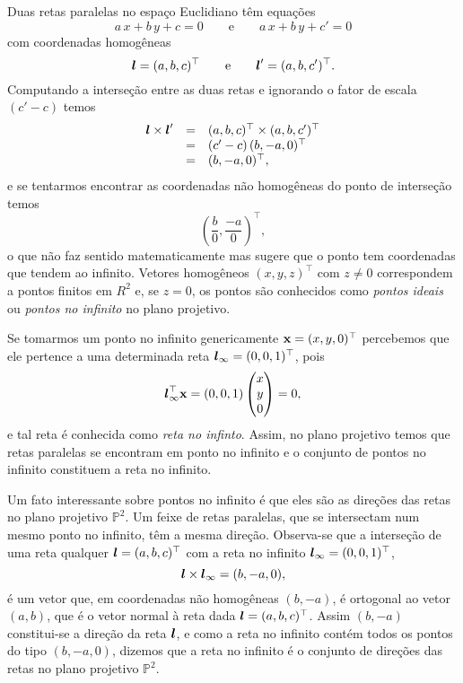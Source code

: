 Duas retas paralelas no espaço Euclidiano têm equações
\begin{equation*}
a\,x+b\,y+c=0\qquad\text{e}\qquad a\,x+b\,y+c'=0
\end{equation*}
com coordenadas homogêneas
\begin{equation*}
\boldsymbol{l}=(a,b,c)^\top\qquad\text{e}\qquad\boldsymbol{l}'=(a,b,c')^\top.
\end{equation*}
Computando a interseção entre as duas retas e ignorando o fator de escala $(c'-c)$ temos
\begin{equation*}
\begin{array}{rcl}
\boldsymbol{l}\times\boldsymbol{l}'&=&(a,b,c)^\top\times(a,b,c')^\top\\
&=&(c'-c)\,(b,-a,0)^\top\\
&=&(b,-a,0)^\top,
\end{array}
\end{equation*}
e se tentarmos encontrar as coordenadas não homogêneas do ponto de interseção temos
\begin{equation*}
\left(\frac{b}{0},\frac{-a}{0}\right)^\top,
\end{equation*}
o que não faz sentido matematicamente mas sugere que o ponto tem coordenadas que tendem ao infinito. Vetores homogêneos $(x,y,z)^\top$ com $z\neq0$ correspondem a pontos finitos em $R^2$ e, se $z=0$, os pontos são conhecidos como \textit{pontos ideais} ou \textit{pontos no infinito} no plano projetivo.

Se tomarmos um ponto no infinito genericamente $\mathbf{x}=(x,y,0)^\top$ percebemos que ele pertence a uma determinada reta $\boldsymbol{l}_\infty=(0,0,1)^\top$, pois
\begin{equation*}
\boldsymbol{l}_\infty^\top \mathbf{x}=(0,0,1)
\begin{pmatrix}
x\\
y\\
0
\end{pmatrix}
=0,
\end{equation*} 
e tal reta é conhecida como \textit{reta no infinto}. Assim, no plano projetivo temos que retas paralelas se encontram em ponto no infinito e o conjunto de pontos no infinito constituem a reta no infinito.

Um fato interessante sobre pontos no infinito é que eles são as direções das retas no plano projetivo $\mathbb{P}^2$. Um feixe de retas paralelas, que se intersectam num mesmo ponto no infinito, têm a mesma direção. Observa-se que a interseção de uma reta qualquer $\boldsymbol{l}=(a,b,c)^\top$ com a reta no infinito $\boldsymbol{l}_\infty=(0,0,1)^\top$,
\begin{equation*}
\boldsymbol{l}\times \boldsymbol{l}_\infty=(b,-a,0),
\end{equation*}
é um vetor que, em coordenadas não homogêneas $(b,-a)$, é ortogonal ao vetor $(a,b)$, que é o vetor normal à reta dada $\boldsymbol{l}=(a,b,c)^\top$. Assim $(b,-a)$ constitui-se a direção da reta $\boldsymbol{l}$, e como a reta no infinito contém todos os pontos do tipo $(b,-a,0)$, dizemos que a reta no infinito é o conjunto de direções das retas no plano projetivo $\mathbb{P}^2$.
